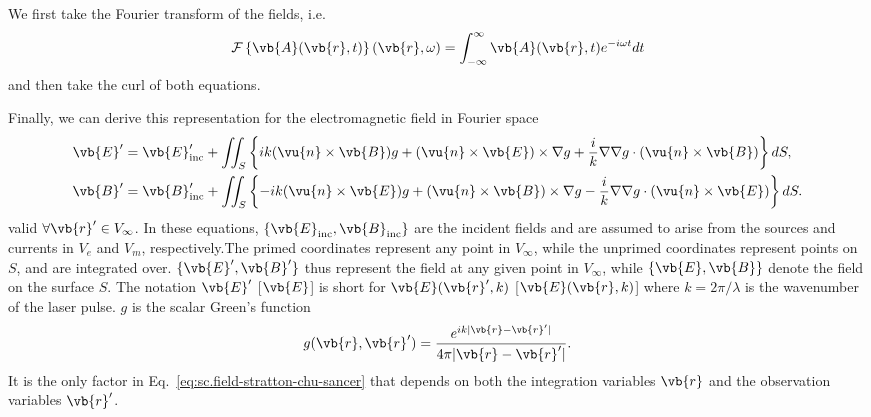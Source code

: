 \documentclass[11pt,SymmetricalJury]{inrsthesis/inrsthesis}
\begin{document}
We first take the Fourier transform of the fields, i.e.
  \begin{equation}
    \mathcal{F}\left\{\vb{A}(\vb{r},t)\right\}(\vb{r},\omega)
                      = \int_{-\infty}^\infty \vb{A}(\vb{r},t)e^{-i\omega t }dt
  \end{equation}
and then take the curl of both equations.

Finally, we can derive this representation for the electromagnetic field
in Fourier space
  \begin{subequations}
  \label{eq:sc.field-stratton-chu-sancer}
  \begin{align}
  \vb{E}' &=
     \vb{E}_\text{inc}'+\iint_{S}
    \left\{ ik(\vu{n}\times \vb{B})              g
          +   (\vu{n}\times \vb{E})\times \nabla g
          +\frac{i}{k}\nabla\nabla g\cdot(\vu{n}\times\vb{B})
    \right\} dS,
  \label{eq:sc.efield-stratton-chu-sancer}\\
  \vb{B}' &=
    \vb{B}_\text{inc}' + \iint_{S}
    \left\{-ik(\vu{n}\times \vb{E})              g
          +   (\vu{n}\times \vb{B})\times \nabla g
          -\frac{i}{k}\nabla\nabla g\cdot(\vu{n}\times\vb{E})
    \right\} dS.
  \label{eq:sc.bfield-stratton-chu-sancer}
  \end{align}
  \end{subequations}
valid $\forall\vb{r}'\in V_\infty$. In these equations, $\{\vb{E}_\text{inc},\vb{B}_\text{inc}\}$
are the incident fields and are assumed
to arise from the sources and currents in $V_e$ and $V_m$, respectively.The primed coordinates
represent any point in $V_\infty$, while the unprimed coordinates represent points
on $S$, and are integrated over. $\{\vb{E}', \vb{B}'\}$ thus represent the field at any
given point in $V_\infty$, while $\{\vb{E}, \vb{B}\}$ denote the field on the surface $S$.
The notation $\vb{E}'$ [$\vb{E}$] is short for $\vb{E}(\vb{r}',k)$ [$\vb{E}(\vb{r},k)$]
where $k=2\pi/\lambda$ is the wavenumber of the laser pulse. $g$ is the scalar Green's function
  \begin{equation}
    g(\vb{r},\vb{r}') = \frac{e^{ik|\vb{r}-\vb{r}'|}}{4\pi|\vb{r}-\vb{r}'|}.
  \end{equation}
It is the only factor in Eq.~\eqref{eq:sc.field-stratton-chu-sancer}
that depends on both the integration variables $\vb{r}$
and the observation variables $\vb{r}'$.
\end{document}
